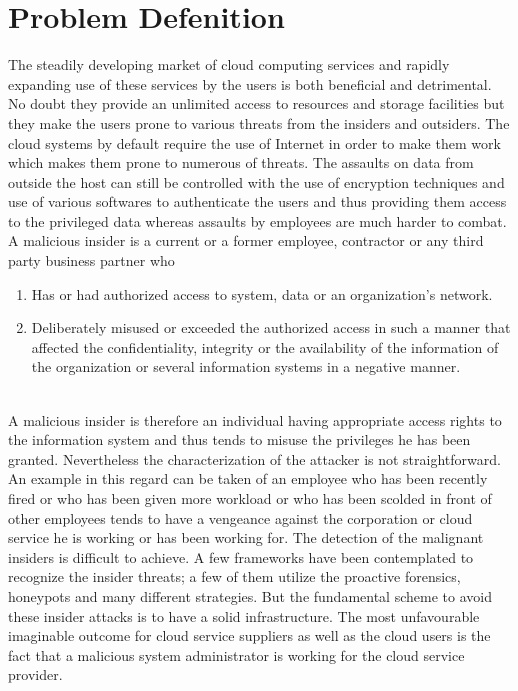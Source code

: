 \section{Problem Defenition}
\label{problem_defenition}

The steadily developing market of cloud computing services and rapidly expanding use of these
services by the users is both beneficial and detrimental. No doubt they provide an unlimited
access to resources and storage facilities but they make the users prone to various threats from
the insiders and outsiders. The cloud systems by default require the use of Internet in order to
make them work which makes them prone to numerous of threats. The assaults on data from
outside the host can still be controlled with the use of encryption techniques and use of various
softwares to authenticate the users and thus providing them access to the privileged data whereas
assaults by employees are much harder to combat.
A malicious insider is a current or a former employee, contractor or any third party business partner who
\\
\begin{enumerate}

  \item Has or had authorized access to system, data or an organization’s network.

  \item Deliberately misused or exceeded the authorized access in such a manner that affected the confidentiality, integrity or the availability of the information of the organization or several information systems in a negative manner.

\end{enumerate}
\\
A malicious insider is therefore an individual having appropriate access rights to the
information system and thus tends to misuse the privileges he has been granted. Nevertheless
the characterization of the attacker is not straightforward. An example in this regard can be
taken of an employee who has been recently fired or who has been given more workload or
who has been scolded in front of other employees tends to have a vengeance against the
corporation or cloud service he is working or has been working for.
The detection of the malignant insiders is difficult to achieve. A few frameworks have been
contemplated to recognize the insider threats; a few of them utilize the proactive forensics,
honeypots and many different strategies. But the fundamental scheme to avoid these insider
attacks is to have a solid infrastructure.
The most unfavourable imaginable outcome for cloud service suppliers as well as the cloud
users is the fact that a malicious system administrator is working for the cloud service provider.
